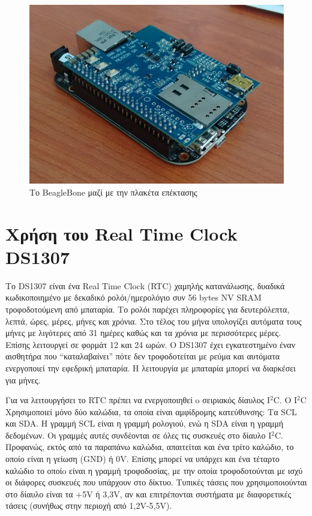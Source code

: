 \documentclass[12pt, a4paper, oneside]{report}
\begin{document}
\begin{figure}[!hb]
\centering
\includegraphics[scale=0.5]{eikona_36}
\caption{Το BeagleBone μαζί με την πλακέτα επέκτασης}\label{eik36}
\end{figure}
\clearpage
\section{Χρήση του Real Time Clock DS1307}

Το DS1307 είναι ένα Real Time Clock (RTC) χαμηλής κατανάλωσης, δυαδικά κωδικοποιημένο με δεκαδικό ρολόι\slash ημερολόγιο συν 56 bytes ΝV SRAM τροφοδοτούμενη από μπαταρία. Το ρολόι παρέχει πληροφορίες για δευτερόλεπτα, λεπτά, ώρες, μέρες, μήνες και χρόνια. Στο τέλος του μήνα υπολογίζει αυτόματα τους μήνες με λιγότερες από 31 ημέρες καθώς και τα χρόνια με περισσότερες μέρες. Επίσης λειτουργεί σε φορμάτ 12 και 24 ωρών. Ο DS1307 έχει εγκατεστημένο έναν αισθητήρα που ``καταλαβαίνει'' πότε δεν τροφοδοτείται με ρεύμα και αυτόματα ενεργοποιεί την εφεδρική μπαταρία. Η λειτουργία με μπαταρία μπορεί να διαρκέσει για μήνες.

Για να λειτουργήσει το RTC πρέπει να ενεργοποιηθεί o σειριακός δίαυλος I$^2$C. Ο I$^2$C Χρησιμοποιεί μόνο δύο καλώδια, τα οποία είναι αμφίδρομης κατεύθυνσης: Τα SCL και SDA. Η γραμμή SCL είναι η γραμμή ρολογιού, ενώ η SDA είναι η γραμμή δεδομένων. Οι γραμμές αυτές συνδέονται σε όλες τις συσκευές στο δίαυλο I$^2$C. Προφανώς, εκτός από τα παραπάνω καλώδια, απαιτείται και ένα τρίτο καλώδιο, το οποίο είναι η γείωση (GND) ή 0V. Επίσης μπορεί να υπάρχει και ένα τέταρτο καλώδιο το οποίo είναι η γραμμή τροφοδοσίας, με την οποία τροφοδοτούνται με ισχύ οι διάφορες συσκευές που υπάρχουν στο δίκτυο. Τυπικές τάσεις που χρησιμοποιούνται στο δίαυλο είναι τα +5V ή 3,3V, αν και επιτρέπονται συστήματα με διαφορετικές τάσεις (συνήθως στην περιοχή από 1,2V-5,5V).
\end{document}
